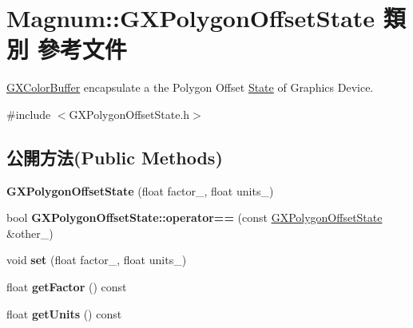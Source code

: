 \hypertarget{class_magnum_1_1_g_x_polygon_offset_state}{}\section{Magnum\+:\+:G\+X\+Polygon\+Offset\+State 類別 參考文件}
\label{class_magnum_1_1_g_x_polygon_offset_state}


\hyperlink{class_magnum_1_1_g_x_color_buffer}{G\+X\+Color\+Buffer} encapsulate a the Polygon Offset \hyperlink{class_magnum_1_1_state}{State} of Graphics Device.  




{\ttfamily \#include $<$G\+X\+Polygon\+Offset\+State.\+h$>$}

\subsection*{公開方法(Public Methods)}
\begin{DoxyCompactItemize}
\item 
{\bfseries G\+X\+Polygon\+Offset\+State} (float factor\+\_\+, float units\+\_\+)\hypertarget{class_magnum_1_1_g_x_polygon_offset_state_a4da71224616598e324541df699416490}{}\label{class_magnum_1_1_g_x_polygon_offset_state_a4da71224616598e324541df699416490}

\item 
bool {\bfseries G\+X\+Polygon\+Offset\+State\+::operator==} (const \hyperlink{class_magnum_1_1_g_x_polygon_offset_state}{G\+X\+Polygon\+Offset\+State} \&other\+\_\+)\hypertarget{class_magnum_1_1_g_x_polygon_offset_state_a8a5483326c73c2571a3a2095f54e6344}{}\label{class_magnum_1_1_g_x_polygon_offset_state_a8a5483326c73c2571a3a2095f54e6344}

\item 
void {\bfseries set} (float factor\+\_\+, float units\+\_\+)\hypertarget{class_magnum_1_1_g_x_polygon_offset_state_aed413355e8c1bbf860ac86bc43e156a9}{}\label{class_magnum_1_1_g_x_polygon_offset_state_aed413355e8c1bbf860ac86bc43e156a9}

\item 
float {\bfseries get\+Factor} () const \hypertarget{class_magnum_1_1_g_x_polygon_offset_state_a439e58105354fbc5827f6789c448130c}{}\label{class_magnum_1_1_g_x_polygon_offset_state_a439e58105354fbc5827f6789c448130c}

\item 
float {\bfseries get\+Units} () const \hypertarget{class_magnum_1_1_g_x_polygon_offset_state_a368e4a9a1628a154fad21b992335f503}{}\label{class_magnum_1_1_g_x_polygon_offset_state_a368e4a9a1628a154fad21b992335f503}

\end{DoxyCompactItemize}


